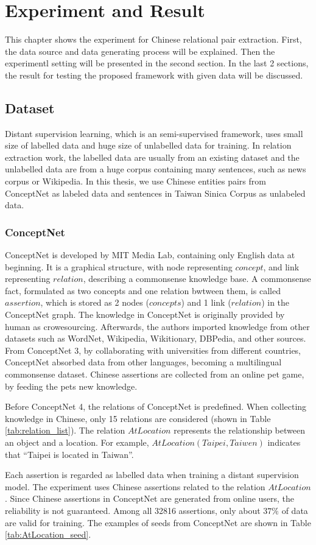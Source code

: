 \chapter{Experiment and Result}
This chapter shows the experiment for Chinese relational pair extraction.
First, the data source and data generating process will be explained.
Then the experimentl setting will be presented in the second section.
In the last 2 sections, the result for testing the proposed framework with given data will be discussed.

\section{Dataset}
Distant supervision learning, which is an semi-supervised framework, uses small size of labelled data and huge size of unlabelled data for training.
In relation extraction work, the labelled data are usually from an existing dataset and the unlabelled data are from a huge corpus containing many sentences, such as news corpus or Wikipedia.
In this thesis, we use Chinese entities pairs from ConceptNet as labeled data and sentences in Taiwan Sinica Corpus as unlabeled data.

\subsection{ConceptNet}
ConceptNet is developed by MIT Media Lab\cite{ConceptNet5}, containing only English data at beginning.
It is a graphical structure, with node representing $concept$, and link representing $relation$, describing a commonsense knowledge base.
A commonsense fact, formulated as two concepts and one relation bwtween them, is called $assertion$, which is stored as 2 nodes ($concepts$) and 1 link ($relation$) in the ConceptNet graph.
The knowledge in ConceptNet is originally provided by human as crowesourcing.
Afterwards, the authors imported knowledge from other datasets such as WordNet, Wikipedia, Wikitionary, DBPedia, and other sources.
From ConceptNet 3, by collaborating with universities from different countries, ConceptNet absorbed data from other languages, becoming a multilingual commonsense dataset.
Chinese assertions are collected from an online pet game, by feeding the pets new knowledge.
\par
Before ConceptNet 4, the relations of ConceptNet is predefined.
When collecting knowledge in Chinese, only 15 relations are considered (shown in Table \ref{tab:relation_list}).
The relation $AtLocation$ represents the relationship between an object and a location. For example, $AtLocation(Taipei, Taiwen)$ indicates that ``Taipei is located in Taiwan''.
\par
Each assertion is regarded as labelled data when training a distant supervision model.
The experiment uses Chinese assertions related to the relation $AtLocation$.
Since Chinese assertions in ConceptNet are generated from online users, the reliability is not guaranteed.
Among all 32816 assertions, only about $37\%$ of data are valid for training.
The examples of seeds from ConceptNet are shown in Table \ref{tab:AtLocation_seed}.

